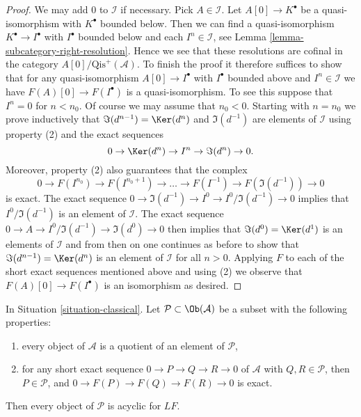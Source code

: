 \begin{proof}
We may add $0$ to $\mathcal{I}$ if necessary. Pick $A \in \mathcal{I}$.
Let $A[0] \to K^\bullet$ be a quasi-isomorphism with $K^\bullet$
bounded below. Then we can find a quasi-isomorphism
$K^\bullet \to I^\bullet$ with $I^\bullet$ bounded below and
each $I^n \in \mathcal{I}$, see
Lemma \ref{lemma-subcategory-right-resolution}.
Hence we see that these resolutions are cofinal in the category
$A[0]/\text{Qis}^{+}(\mathcal{A})$. To finish the proof it therefore
suffices to show that for any quasi-isomorphism
$A[0] \to I^\bullet$ with $I^\bullet$ bounded above and $I^n \in \mathcal{I}$
we have $F(A)[0] \to F(I^\bullet)$ is a quasi-isomorphism.
To see this suppose that $I^n = 0$ for $n < n_0$. Of course we may assume
that $n_0 < 0$. Starting with $n = n_0$ we prove inductively that
$\Im(d^{n - 1}) = \Ker(d^n)$ and $\Im(d^{-1})$
are elements of $\mathcal{I}$ using property (2) and the exact sequences
$$
0 \to \Ker(d^n) \to I^n \to \Im(d^n) \to 0.
$$
Moreover, property (2) also guarantees that the complex
$$
0 \to F(I^{n_0}) \to F(I^{n_0 + 1}) \to \ldots \to F(I^{-1}) \to
F(\Im(d^{-1})) \to 0
$$
is exact. The exact sequence
$0 \to \Im(d^{-1}) \to I^0 \to I^0/\Im(d^{-1}) \to 0$
implies that $I^0/\Im(d^{-1})$ is an element of $\mathcal{I}$.
The exact sequence $0 \to A \to I^0/\Im(d^{-1}) \to \Im(d^0) \to 0$
then implies that $\Im(d^0) = \Ker(d^1)$ is an elements of
$\mathcal{I}$ and from then on one continues as before to show that
$\Im(d^{n - 1}) = \Ker(d^n)$ is an element of $\mathcal{I}$
for all $n > 0$. Applying $F$ to each of the short exact sequences
mentioned above and using (2) we observe that $F(A)[0] \to F(I^\bullet)$
is an isomorphism as desired.
\end{proof}

\begin{lemma}
\label{lemma-subcategory-left-acyclics}
In
Situation \ref{situation-classical}.
Let $\mathcal{P} \subset \Ob(\mathcal{A})$ be a subset with the
following properties:
\begin{enumerate}
\item every object of $\mathcal{A}$ is a quotient of an element of
$\mathcal{P}$,
\item for any short exact sequence $0 \to P \to Q \to R \to 0$ of
$\mathcal{A}$ with $Q, R \in \mathcal{P}$, then $P \in \mathcal{P}$,
and $0 \to F(P) \to F(Q) \to F(R) \to 0$ is exact.
\end{enumerate}
Then every object of $\mathcal{P}$ is acyclic for $LF$.
\end{lemma}

